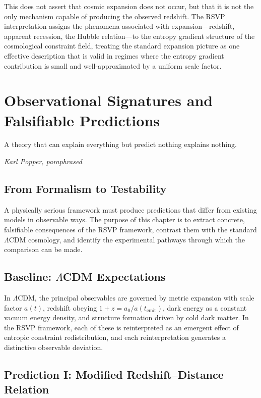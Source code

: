\documentclass[12pt,a4paper,openany]{book}
\theoremstyle{plain}
\theoremstyle{definition}
\theoremstyle{remark}
\begin{document}
This does not assert that cosmic expansion does not occur, but that it is not the only mechanism capable of producing the observed redshift. The RSVP interpretation assigns the phenomena associated with expansion---redshift, apparent recession, the Hubble relation---to the entropy gradient structure of the cosmological constraint field, treating the standard expansion picture as one effective description that is valid in regimes where the entropy gradient contribution is small and well-approximated by a uniform scale factor.

\chapter{Observational Signatures and Falsifiable Predictions}
\label{chap:observational_tests}

\epigraph{%
  A theory that can explain everything but predict nothing explains nothing.
}{%
  \textit{Karl Popper, paraphrased}}

\section{From Formalism to Testability}

A physically serious framework must produce predictions that differ from existing models in observable ways. The purpose of this chapter is to extract concrete, falsifiable consequences of the RSVP framework, contrast them with the standard $\Lambda$CDM cosmology, and identify the experimental pathways through which the comparison can be made.

\section{Baseline: $\Lambda$CDM Expectations}

In $\Lambda$CDM, the principal observables are governed by metric expansion with scale factor $a(t)$, redshift obeying $1 + z = a_0/a(t_{\mathrm{emit}})$, dark energy as a constant vacuum energy density, and structure formation driven by cold dark matter. In the RSVP framework, each of these is reinterpreted as an emergent effect of entropic constraint redistribution, and each reinterpretation generates a distinctive observable deviation.

\section{Prediction I: Modified Redshift--Distance Relation}
\end{document}

